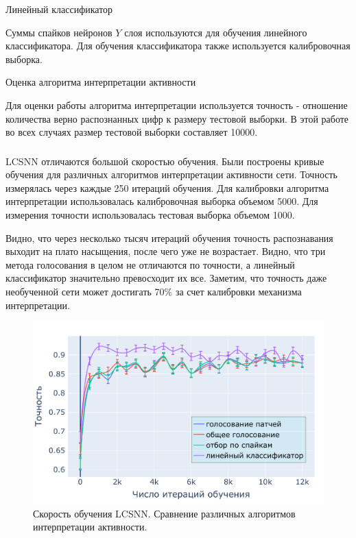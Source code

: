 \documentclass[a4paper]{article}
\begin{document}
\begin{center}
 Линейный классификатор
\end{center}
Суммы спайков нейронов $Y$ слоя используются для обучения линейного классификатора. Для обучения классификатора также используется калибровочная выборка.

\begin{center}
 Оценка алгоритма интерпретации активности
\end{center}
Для оценки работы алгоритма интерпретации используется точность - отношение количества верно распознанных цифр к размеру тестовой выборки. В этой работе во всех случаях размер тестовой выборки составляет 10000. 

\subsubsection{}
LCSNN отличаются большой скоростью обучения. Были построены кривые обучения для различных алгоритмов интерпретации активности сети. Точность измерялась через каждые 250 итераций обучения. Для калибровки алгоритма интерпретации использовалась калибровочная выборка объемом 5000. Для измерения точности использовалась тестовая выборка объемом 1000.

Видно, что через несколько тысяч итераций обучения точность распознавания выходит на плато насыщения, после чего уже не возрастает. Видно, что три метода голосования в целом не отличаются по точности, а линейный классификатор значительно превосходит их все. Заметим, что точность даже необученной сети может достигать 70\% за счет калибровки механизма интерпретации.

\begin{center}
\begin{figure}[H] 
 \includegraphics[width=\textwidth,keepaspectratio=true]{LCSNN_learning_rate_ru.pdf}
 \caption{Скорость обучения LCSNN. Сравнение различных алгоритмов интерпретации активности.}
\end{figure}
\end{center}
\end{document}
